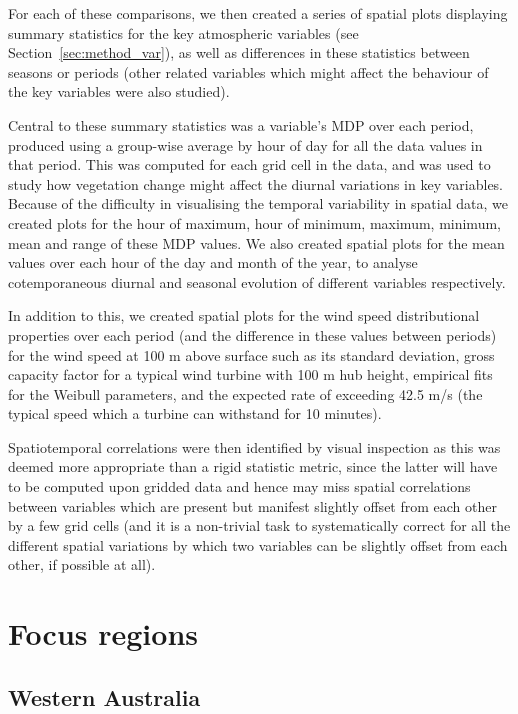 For each of these comparisons, we then created a series of spatial plots displaying summary statistics for the key atmospheric variables (see Section~\ref{sec:method_var}), as well as differences in these statistics between seasons or periods (other related variables which might affect the behaviour of the key variables were also studied).

Central to these summary statistics was a variable's \ac{MDP} over each period, produced using a group-wise average by hour of day for all the data values in that period. This was computed for each grid cell in the data, and was used to study how vegetation change might affect the diurnal variations in key variables. Because of the difficulty in visualising the temporal variability in spatial data, we created plots for the hour of maximum, hour of minimum, maximum, minimum, mean and range of these \ac{MDP} values. We also created spatial plots for the mean values over each hour of the day and month of the year, to analyse cotemporaneous diurnal and seasonal evolution of different variables respectively.

In addition to this, we created spatial plots for the wind speed distributional properties over each period (and the difference in these values between periods) for the wind speed at 100 m above surface such as its standard deviation, gross capacity factor for a typical wind turbine with 100 m hub height, empirical fits for the Weibull parameters, and the expected rate of exceeding 42.5 m/s (the typical speed which a turbine can withstand for 10 minutes).

Spatiotemporal correlations were then identified by visual inspection as this was deemed more appropriate than a rigid statistic metric, since the latter will have to be computed upon gridded data and hence may miss spatial correlations between variables which are present but manifest slightly offset from each other by a few grid cells (and it is a non-trivial task to systematically correct for all the different spatial variations by which two variables can be slightly offset from each other, if possible at all).

\section{Focus regions}

\subsection{Western Australia}

